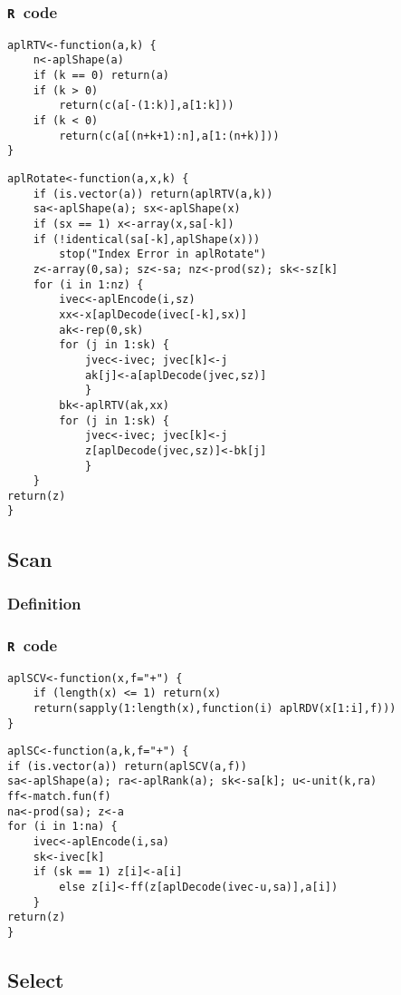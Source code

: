 \documentclass[11pt]{amsart}
\theoremstyle{plain}
\theoremstyle{definition}
\theoremstyle{remark}
\newcommand{\tR}{\texttt{R}}
\begin{document}
\subsubsection{\tR\ code}\quad
\begin{lstlisting}
aplRTV<-function(a,k) {
    n<-aplShape(a)
    if (k == 0) return(a)
    if (k > 0)
        return(c(a[-(1:k)],a[1:k]))
    if (k < 0)
        return(c(a[(n+k+1):n],a[1:(n+k)]))
}
\end{lstlisting}
\begin{lstlisting}
aplRotate<-function(a,x,k) {
    if (is.vector(a)) return(aplRTV(a,k))
    sa<-aplShape(a); sx<-aplShape(x)
    if (sx == 1) x<-array(x,sa[-k])
    if (!identical(sa[-k],aplShape(x)))
        stop("Index Error in aplRotate")
    z<-array(0,sa); sz<-sa; nz<-prod(sz); sk<-sz[k]
    for (i in 1:nz) {
        ivec<-aplEncode(i,sz)
        xx<-x[aplDecode(ivec[-k],sx)]
        ak<-rep(0,sk)
        for (j in 1:sk) {       
            jvec<-ivec; jvec[k]<-j
            ak[j]<-a[aplDecode(jvec,sz)]
            }       
        bk<-aplRTV(ak,xx)
        for (j in 1:sk) {       
            jvec<-ivec; jvec[k]<-j
            z[aplDecode(jvec,sz)]<-bk[j]
            }       
    }
return(z)
}
\end{lstlisting}
\subsection{Scan}\quad
\subsubsection{Definition}
\subsubsection{\tR\ code}\quad
\begin{lstlisting}
aplSCV<-function(x,f="+") {
    if (length(x) <= 1) return(x)
    return(sapply(1:length(x),function(i) aplRDV(x[1:i],f)))
}
\end{lstlisting}
\begin{lstlisting}
aplSC<-function(a,k,f="+") {
if (is.vector(a)) return(aplSCV(a,f))
sa<-aplShape(a); ra<-aplRank(a); sk<-sa[k]; u<-unit(k,ra)
ff<-match.fun(f)
na<-prod(sa); z<-a
for (i in 1:na) {
    ivec<-aplEncode(i,sa)
    sk<-ivec[k]
    if (sk == 1) z[i]<-a[i]
        else z[i]<-ff(z[aplDecode(ivec-u,sa)],a[i])
    }
return(z)
}
\end{lstlisting}

\subsection{Select}\quad
\end{document}

